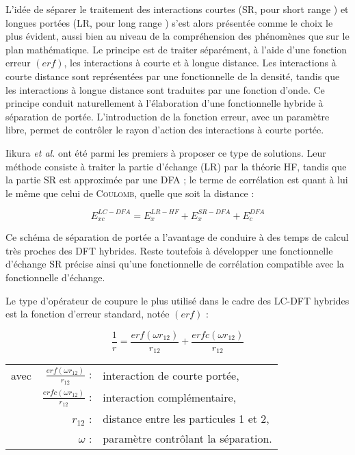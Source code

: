 	L'idée de séparer le traitement des interactions courtes (SR, pour \og short range \fg{}) et longues portées (LR, pour \og long range \fg{}) s'est alors présentée comme le choix le plus évident, aussi bien au niveau de la compréhension des phénomènes que sur le plan mathématique. Le principe est de traiter séparément, à l'aide d'une fonction erreur $(erf)$, les interactions à courte et à longue distance. Les interactions à courte distance sont représentées par une fonctionnelle de la densité, tandis que les interactions à longue distance sont traduites par une fonction d'onde. Ce principe conduit naturellement à l'élaboration d'une fonctionnelle hybride à séparation de portée. L'introduction de la fonction erreur, avec un paramètre libre, permet de contrôler le rayon d'action des interactions à courte portée.
	
	Iikura \textit{et al.} \cite{iikura2001long} ont été parmi les premiers à proposer ce type de solutions. Leur méthode consiste à traiter la partie d'échange (LR) par la théorie HF, tandis que la partie SR est approximée par une DFA ; le terme de corrélation est quant à lui le même que celui de \textsc{Coulomb}, quelle que soit la distance :
	
	\begin{equation}
	E_{xc}^{LC-DFA} = E_{x}^{LR-HF} + E_{x}^{SR-DFA} + E_{c}^{DFA}
	\end{equation}
	
	Ce schéma de séparation de portée a l'avantage de conduire à des temps de calcul très proches des DFT hybrides. Reste toutefois à développer une fonctionnelle d'échange SR précise ainsi qu'une fonctionnelle de corrélation compatible avec la fonctionnelle d'échange.
	
	Le type d'opérateur de coupure le plus utilisé dans le cadre des LC-DFT hybrides est la fonction d'erreur standard, notée $(erf)$ :
	
	\begin{equation}
	\frac{1}{r} = \frac{erf(\omega r_{12})}{r_{12}} + \frac{erfc(\omega r_{12})}{r_{12}}
	\label{erf}
	\end{equation}
	
	\begin{flushleft}
		\begin{tabular}{@{}lrp{10cm}}
			avec & $\frac{erf(\omega r_{12})}{r_{12}}$ : & interaction de courte portée, \\
			& $\frac{erfc(\omega r_{12})}{r_{12}}$ : & interaction complémentaire, \\
			& $r_{12}$ : & distance entre les particules 1 et 2, \\
			& $\omega$ : & paramètre contrôlant la séparation.
		\end{tabular}
	\end{flushleft}
	
